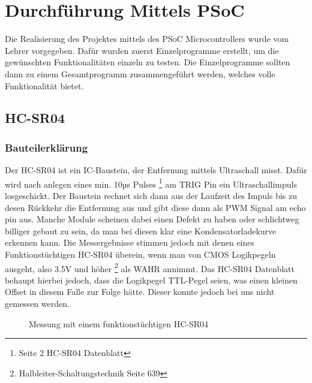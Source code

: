 \documentclass[12pt,a4paper]{article}
\begin{document}
\fi

\section{Durchführung Mittels PSoC}

	Die Realisierung des Projektes mittels des PSoC Microcontrollers wurde
	vom Lehrer vorgegeben. Dafür wurden zuerst Einzelprogramme erstellt,
	um die gewünschten Funktionalitäten einzeln zu testen. Die
	Einzelprogramme sollten dann zu einem Gesamtprogramm zusammengeführt
	werden, welches volle Funktionalität bietet.

\subsection{HC-SR04}

\subsubsection{Bauteilerklärung}
	
	Der HC-SR04 ist ein IC-Baustein, der Entfernung mittels Ultraschall
	misst. Dafür wird nach anlegen eines min. 10µs Pulses
	\footnote{Seite 2 HC-SR04 Datenblatt}
	am TRIG Pin
	ein Ultraschallimpuls losgeschickt. Der Baustein rechnet sich dann aus
	der Laufzeit des Impuls bis zu desen Rückkehr die Entfernung aus und
	gibt diese dann als PWM Signal am echo pin aus. Manche
	Module scheinen dabei einen Defekt zu haben oder schlichtweg billiger
	gebaut zu sein, da man bei diesen klar eine Kondensatorladekurve
	erkennen kann. Die Messergebnisse stimmen jedoch mit denen eines
	Funktionstüchtigen HC-SR04 überein, wenn man von CMOS Logikpegeln
	ausgeht, also 3.5V und höher
	\footnote{Halbleiter-Schaltungstechnik Seite 639} als 
	WAHR annimmt. Das HC-SR04 Datenblatt behaupt hierbei jedoch, dass die
	Logikpegel TTL-Pegel seien, was einen kleinen Offset in diesem Falle
	zur Folge hätte. Dieser konnte jedoch bei uns nicht gemessen werden.
	

	\begin{figure}[H]
		
		\centering
		\label{fig:hc-sr04_working}

		\caption{Messung mit einem funktionstüchtigen HC-SR04}
	\end{figure}
	
\end{document}
